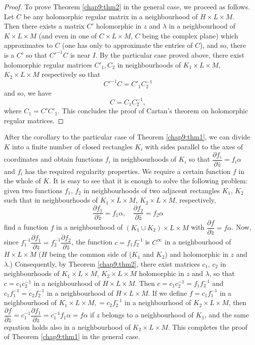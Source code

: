 \begin{proof}
To prove Theorem \ref{chap9:thm2} in the general case, we proceed as
follows. Let $C$ 
be any holomorphic regular matrix in a neighbourhood of $H \times L
\times M$. Then there exists a matrix $C'$ holomorphic in $z$ and
$\lambda$ in a neighbourhood of $K \times L \times M$ (and even in one
of $C \times L \times M$, $C$ being the complex plane) which
approximates to $C$ (one has only to approximate the entries of $C$),
and so, there is a $C'$ so that $C'^{-1} C$ is near $I$. By the
particular case proved above, there exist holomorphic regular matrices
$C'_1, C_2$ in neighbourhoods of $K_1 \times L \times M$, $K_2 \times
L \times M$ respectively so that 
$$
C'^{-1} C = C'_1 C^{-1}_2
$$
and so, we have 
$$
C = C_1 C^{-1}_2,
$$
where $C_1 = C' C'_1$. This concludes the proof of Cartan's theorem on
holomorphic regular matrices. 
\end{proof}

\medskip
{}

After the corollary to the particular case of Theorem
\ref{chap9:thm1}, we can divide 
$K$ into a finite number of closed rectangles $K_i$ with sides
parallel to the axes of coordinates and obtain functions $f_i$ in
neighbourhoods of $K_i$ so that $\dfrac{\partial f_i}{\partial
  \bar{z}} = f_i \alpha$ and $f_i$ has the required regularity
properties. We require a certain function $f$ in the whole of $K$. It
is easy to see that it is enough to solve the following problem: given
two functions $f_1$, $f_2$ in neighbourhoods of two adjacent
rectangles $K_1$, $K_2$ such that in neighbourhoods of $K_1 \times L
\times M$, $K_2 \times L \times M$, respectively,
$$
\frac{\partial f_1}{\partial \bar{z}} = f_1 \alpha, \quad
\frac{\partial f_2}{\partial \bar{z}} = f_2 \alpha
$$\pageoriginale
find a function $f$ in a neighbourhood of $(K_1 \cup K_2) \times L
\times M$ with $\dfrac{\partial f}{\partial \bar{z}} = f\alpha$. Now,
since $f^{-1}_1 \dfrac{\partial f_1}{\partial \bar{z}} = f^{-1}_2
\dfrac{\partial f_2}{\partial \bar{z}}$, the function $c = f_1
f^{-1}_2$ is $C^{\infty}$ in a neighbourhood of $H \times L \times M$
($H$ being the common side of ($K_1$ and $K_2$) and holomorphic in $z$
and $\lambda$.) Consequently, by Theorem \ref{chap9:thm2}, there exist
matrices $c_1$, 
$c_2$ in neighbourhoods of $K_1 \times L \times M$, $K_2 \times L
\times M$ holomorphic in $z$ and $\lambda$, so that $c = c_1 c^{-1}_2$
in a neighbourhood of $H \times L \times M$. Then $c = c_1 c^{-1}_2 =
f_1 f^{-1}_2$ and $c_1 f^{-1}_1 = c_2 f^{-1}_2$ in a neighbourhood of
$H \times L \times M$. If we define $f = c_1 f^{-1}_1$ in a
neighbourhood of $K_1 \times L \times M, = c_2 f^{-1}_2$ in a
neighbourhood of $K_2 \times L \times M$, then $\dfrac{\partial
  f}{\partial \bar{z}} = c^{-1}_1 \dfrac{\partial f_1}{\partial
  \bar{z}} = c^{-1}_1 f_1 \alpha  = f\alpha$ if $z$ belongs to a
neighbourhood of $K_1$, and the same equation holds also in a
neighbourhood of $K_2 \times L \times M$. This completes the proof of
Theorem \ref{chap9:thm1} in the general case. 
